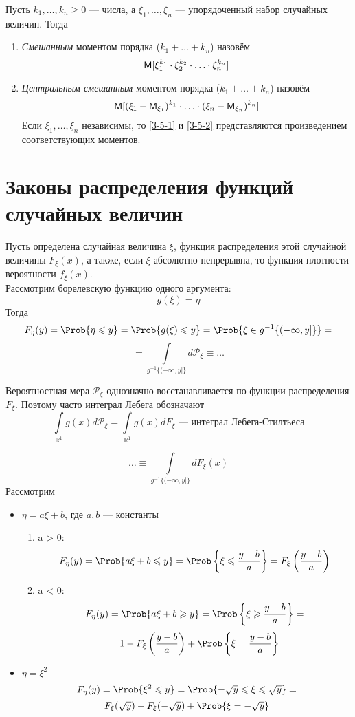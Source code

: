 \begin{definition}
  Пусть $k_1, \ldots, k_n \geqslant 0$ --- числа, а $\xi_1, \ldots, \xi_n$ --- упорядоченный набор случайных величин. Тогда
  \begin{enumerate}
    \item \label{3-5-1} \textit{Смешанным} моментом порядка ($k_1 + \ldots + k_n$) назовём
    \[
      \mathsf{M} [\xi_1^{k_1} \cdot \xi_2^{k_2} \cdot \ldots \cdot \xi_n^{k_n}]
    \]
    \item \label{3-5-2} \textit{Центральным смешанным} моментом порядка ($k_1 + \ldots + k_n$) назовём
    \[
      \mathsf{M} [(\xi_1 - \mathsf{M}_{\xi_1})^{k_1} \cdot \ldots \cdot (\xi_n - \mathsf{M}_{\xi_n})^{k_n}]
    \]
    Если $\xi_1, \ldots, \xi_n$ независимы, то \ref{3-5-1} и \ref{3-5-2} представляются произведением соответствующих моментов.
  \end{enumerate}
\end{definition}

\section{Законы распределения функций случайных величин}
Пусть определена случайная величина $\xi$, функция распределения этой случайной величины $F_{\xi}(x)$, а также, если $\xi$ абсолютно непрерывна, то функция плотности вероятности $f_{\xi}(x)$. \\
Рассмотрим борелевскую функцию одного аргумента:
\[
  g(\xi) = \eta
\]
Тогда
\[
  F_{\eta} (y) = \Prob \{ \eta \leqslant y \} = \Prob \{ g(\xi) \leqslant y \} = \Prob \{ \xi \in g^{-1} \{ (-\infty, y] \} \} =
\]
\[
  = \int\limits_{g^{-1} \{ (-\infty, y] \}} d \mathcal{P}_{\xi} \equiv \ldots
\]
\begin{addition}
  Вероятностная мера $\mathcal{P}_{\xi}$ однозначно восстанавливается по функции распределения $F_{\xi}$. Поэтому часто интеграл Лебега обозначают
  \[
    \int\limits_{\mathbb{R}^1} g(x) d \mathcal{P}_{\xi} = \int\limits_{\mathbb{R}^1} g(x) dF_{\xi} \text{ --- интеграл Лебега-Стилтьеса}
  \]
\end{addition}
\[
 \ldots \equiv \int\limits_{g^{-1} \{ (-\infty, y] \}} d F_{\xi} (x)
\]
Рассмотрим
\begin{itemize}
  \item $\eta = a \xi + b$, где $a, b$ --- константы
  \begin{enumerate}
    \item a > 0:
    \[
      F_{\eta} (y) = \Prob \{a \xi + b \leqslant y \} = \Prob \left\{ \xi \leqslant \frac{y-b}{a} \right\} = F_{\xi} \left( \frac{y-b}{a} \right)
    \]
    \item a < 0:
    \[
      F_{\eta} (y) = \Prob \{a \xi + b \geqslant y \} = \Prob \left\{ \xi \geqslant \frac{y-b}{a} \right\} =
    \]
    \[
      = 1 - F_{\xi} \left( \frac{y-b}{a}\right) + \Prob \left\{ \xi = \frac{y-b}{a} \right\}
    \]
  \end{enumerate}
  \item $\eta = \xi^2$
	\[
		F_{\eta}(y) =  \Prob \{\xi^2 \leqslant y \} = \Prob \{ -\sqrt{y} \leqslant \xi \leqslant \sqrt{y} \} =
	\]
	\[
		F_{\xi}(\sqrt{y})  - F_{\xi} (-\sqrt{ y }) + \Prob \{ \xi = -\sqrt{y} \}
	\]
\end{itemize}

